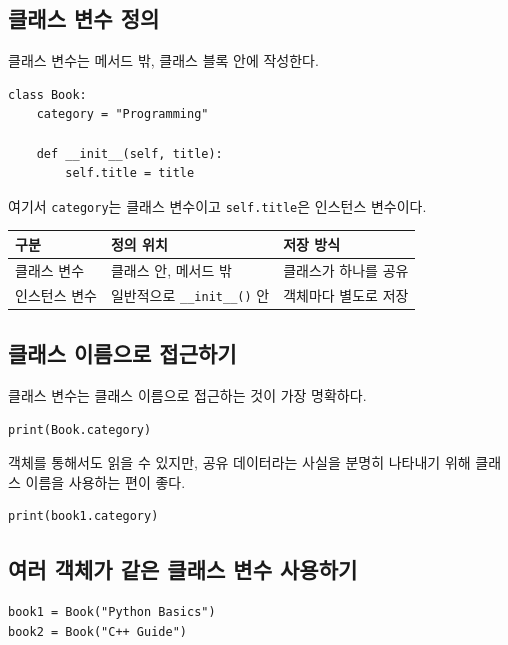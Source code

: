 \documentclass[11pt,a4paper]{article}
\begin{document}
\subsection{클래스 변수 정의}

클래스 변수는 메서드 밖, 클래스 블록 안에 작성한다.

\begin{lstlisting}
class Book:
    category = "Programming"

    def __init__(self, title):
        self.title = title
\end{lstlisting}

여기서 \texttt{category}는 클래스 변수이고 \texttt{self.title}은 인스턴스 변수이다.

\begin{center}
\begin{tabular}{lll}
\toprule
구분 & 정의 위치 & 저장 방식 \\
\midrule
클래스 변수 & 클래스 안, 메서드 밖 & 클래스가 하나를 공유 \\
인스턴스 변수 & 일반적으로 \texttt{\_\_init\_\_()} 안 & 객체마다 별도로 저장 \\
\bottomrule
\end{tabular}
\end{center}

\subsection{클래스 이름으로 접근하기}

클래스 변수는 클래스 이름으로 접근하는 것이 가장 명확하다.

\begin{lstlisting}
print(Book.category)
\end{lstlisting}

객체를 통해서도 읽을 수 있지만, 공유 데이터라는 사실을 분명히 나타내기 위해 클래스 이름을 사용하는 편이 좋다.

\begin{lstlisting}
print(book1.category)
\end{lstlisting}

\subsection{여러 객체가 같은 클래스 변수 사용하기}

\begin{lstlisting}
book1 = Book("Python Basics")
book2 = Book("C++ Guide")
\end{lstlisting}
\end{document}
